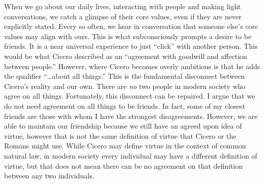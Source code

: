\documentclass[12pt, letterpaper]{article}
\begin{document}
When we go about our daily lives, interacting with people and making light conversations, we catch a glimpse of 
their core values, even if they are never explicitly stated. Every so often, we hear in conversation that 
someone else’s core values may align with ours. This is what subconsciously prompts a desire to be friends. 
It is a near universal experience to just “click” with another person. This would be what Cicero described 
as an ``agreement with goodwill and affection between people.'' However, where Cicero becomes overly ambitious 
is that he adds the qualifier ``\ldots about all things.'' This is the fundamental disconnect between Cicero’s 
reality and our own. There are \emph{no} two people in modern society who agree on all things. Fortunately, this 
disconnect can be repaired. I argue that we do not need agreement on all things to be friends. In fact, some 
of my closest friends are those with whom I have the strongest disagreements. However, we are able to maintain our 
friendship because we still have an agreed upon idea of virtue, however that is not the same definition of 
virtue that Cicero or the Romans might use. While Cicero may define virtue in the context of common natural 
law, in modern society every individual may have a different definition of virtue, but that does not mean there 
can be no agreement on that definition between any two individuals. 

\newpage
\printbibliography
\end{document}
